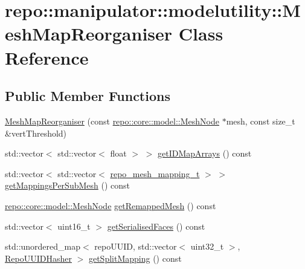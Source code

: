 \hypertarget{classrepo_1_1manipulator_1_1modelutility_1_1_mesh_map_reorganiser}{}\section{repo\+:\+:manipulator\+:\+:modelutility\+:\+:Mesh\+Map\+Reorganiser Class Reference}
\label{classrepo_1_1manipulator_1_1modelutility_1_1_mesh_map_reorganiser}
\subsection*{Public Member Functions}
\begin{DoxyCompactItemize}
\item 
\hyperlink{classrepo_1_1manipulator_1_1modelutility_1_1_mesh_map_reorganiser_a99f778aa78ba17e05caa3e22e4839f40}{Mesh\+Map\+Reorganiser} (const \hyperlink{classrepo_1_1core_1_1model_1_1_mesh_node}{repo\+::core\+::model\+::\+Mesh\+Node} $\ast$mesh, const size\+\_\+t \&vert\+Threshold)
\item 
std\+::vector$<$ std\+::vector$<$ float $>$ $>$ \hyperlink{classrepo_1_1manipulator_1_1modelutility_1_1_mesh_map_reorganiser_a30cbd2f8b0e24bc294be5e9def11b591}{get\+I\+D\+Map\+Arrays} () const 
\item 
std\+::vector$<$ std\+::vector$<$ \hyperlink{structrepo__mesh__mapping__t}{repo\+\_\+mesh\+\_\+mapping\+\_\+t} $>$ $>$ \hyperlink{classrepo_1_1manipulator_1_1modelutility_1_1_mesh_map_reorganiser_a7e05160f88ad0a1103cd7426f8aacd0d}{get\+Mappings\+Per\+Sub\+Mesh} () const 
\item 
\hyperlink{classrepo_1_1core_1_1model_1_1_mesh_node}{repo\+::core\+::model\+::\+Mesh\+Node} \hyperlink{classrepo_1_1manipulator_1_1modelutility_1_1_mesh_map_reorganiser_a29db789d0ad170041a5ecf4fd0dbd583}{get\+Remapped\+Mesh} () const 
\item 
std\+::vector$<$ uint16\+\_\+t $>$ \hyperlink{classrepo_1_1manipulator_1_1modelutility_1_1_mesh_map_reorganiser_a60fb9fad7e304bcfe6abfd5db1182b8b}{get\+Serialised\+Faces} () const 
\item 
std\+::unordered\+\_\+map$<$ repo\+U\+U\+I\+D, std\+::vector$<$ uint32\+\_\+t $>$, \hyperlink{struct_repo_u_u_i_d_hasher}{Repo\+U\+U\+I\+D\+Hasher} $>$ \hyperlink{classrepo_1_1manipulator_1_1modelutility_1_1_mesh_map_reorganiser_a8041d2c041c05563dfa0dd7528f09014}{get\+Split\+Mapping} () const 
\end{DoxyCompactItemize}


